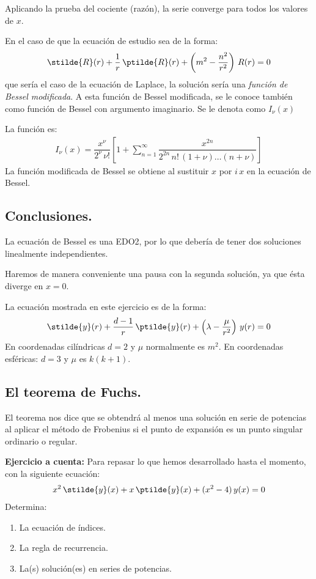 Aplicando la prueba del cociente (razón), la serie converge para todos los valores de $x$.
\par
En el caso de que la ecuación de estudio sea de la forma:
\begin{align*}
\stilde{R} (r) + \dfrac{1}{r} \, \ptilde{R} (r) + \left( m^{2} - \dfrac{n^{2}}{r^{2}} \right) \, R(r) = 0
\end{align*}
que sería el caso de la ecuación de Laplace, la solución sería una \emph{función de Bessel modificada}. A esta función de Bessel modificada, se le conoce también como función de Bessel con argumento imaginario. Se le denota como $I_{\nu}(x)$
\par
La función es:
\begin{align*}
I_{\nu}(x) = \dfrac{x^{\nu}}{2^{\nu} \, \nu!} \left[ 1 + \sum_{n=1}^{\infty} \dfrac{x^{2n}}{2^{2n} \, n! \, (1 + \nu) \ldots (n + \nu)} \right]
\end{align*}
La función modificada de Bessel se obtiene al sustituir $x$ por $i \, x$ en la ecuación de Bessel.

\subsection*{Conclusiones.}

La ecuación de Bessel es una EDO2, por lo que debería de tener dos soluciones linealmente independientes.
\par
Haremos de manera conveniente una pausa con la segunda solución, ya que ésta diverge en $x=0$.
\par
La ecuación mostrada en este ejercicio es de la forma:
\begin{align*}
\stilde{y}(r) + \dfrac{d - 1}{r} \, \ptilde{y}(r) + \left( \lambda - \dfrac{\mu}{r^{2}} \right) \, y(r) = 0
\end{align*}
En coordenadas cilíndricas $d = 2$ y $\mu$ normalmente es $m^{2}$. En coordenadas esféricas: $d = 3$ y $\mu$ es $k(k+1)$.

\subsection{El teorema de Fuchs.}
El teorema nos dice que se obtendrá al menos una solución en serie de potencias al aplicar el método de Frobenius si el punto de expansión es un punto singular ordinario o regular. 

\textbf{Ejercicio a cuenta:}
Para repasar lo que hemos desarrollado hasta el momento, con la siguiente ecuación:
\begin{align*}
x^{2} \, \stilde{y}(x) + x \, \ptilde{y}(x) + (x^{2} - 4) \, y(x) = 0
\end{align*}
Determina:
\begin{enumerate}
\item La ecuación de índices.
\item La regla de recurrencia.
\item La(s) solución(es) en series de potencias.
\end{enumerate}
